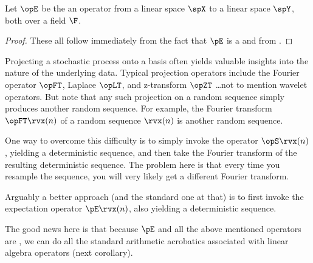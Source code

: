 \begin{corollary}
\label{cor:pE_prop}
Let $\opE$ be the an operator from a linear space $\spX$ to a linear space $\spY$, both over a field $\F$.
\end{corollary}
\begin{proof}
These all follow immediately from the fact that $\pE$ is a  
and from .
\end{proof}

\begin{remark}
Projecting a stochastic process onto a basis often yields valuable insights 
into the nature of the underlying data. 
Typical projection operators include the Fourier operator $\opFT$, Laplace $\opLT$,
and z-transform $\opZT$ \ldots not to mention wavelet operators.
But note that any such projection on a random sequence simply produces another random sequence.
For example, the Fourier transform $\opFT\rvx(n)$ of a random sequence $\rvx(n)$ is another random 
sequence.

One way to overcome this difficulty is to simply invoke the  operator $\opS\rvx(n)$ ,
yielding a deterministic sequence, and then take the Fourier transform of the resulting 
deterministic sequence. 
The problem here is that every time you resample the sequence, you will very likely get a 
different Fourier transform.

Arguably a better approach (and the standard one at that) 
is to first invoke the expectation operator $\pE\rvx(n)$, also yielding a deterministic sequence.

The good news here is that because $\pE$ and all the above mentioned operators are , 
we can do all the standard arithmetic acrobatics associated with linear algebra operators (next corollary).
\end{remark}

